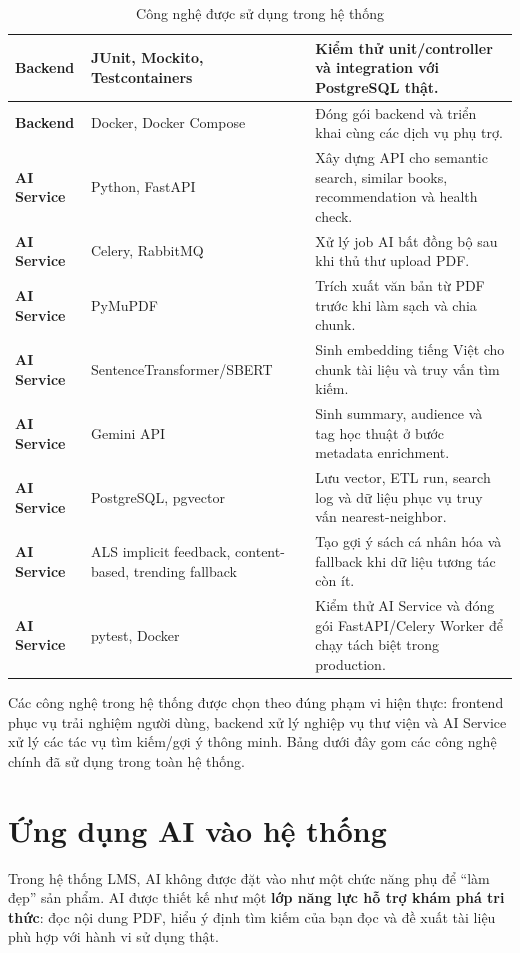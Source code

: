 \begin{table}[H]
\begin{tabularx}{\linewidth}{|p{2.2cm}|p{4.1cm}|X|}
\hline
\textbf{Backend} & JUnit, Mockito, Testcontainers & Kiểm thử unit/controller và integration với PostgreSQL thật. \\
\hline
\textbf{Backend} & Docker, Docker Compose & Đóng gói backend và triển khai cùng các dịch vụ phụ trợ. \\
\hline
\textbf{AI Service} & Python, FastAPI & Xây dựng API cho semantic search, similar books, recommendation và health check. \\
\hline
\textbf{AI Service} & Celery, RabbitMQ & Xử lý job AI bất đồng bộ sau khi thủ thư upload PDF. \\
\hline
\textbf{AI Service} & PyMuPDF & Trích xuất văn bản từ PDF trước khi làm sạch và chia chunk. \\
\hline
\textbf{AI Service} & SentenceTransformer/SBERT & Sinh embedding tiếng Việt cho chunk tài liệu và truy vấn tìm kiếm. \\
\hline
\textbf{AI Service} & Gemini API & Sinh summary, audience và tag học thuật ở bước metadata enrichment. \\
\hline
\textbf{AI Service} & PostgreSQL, pgvector & Lưu vector, ETL run, search log và dữ liệu phục vụ truy vấn nearest-neighbor. \\
\hline
\textbf{AI Service} & ALS implicit feedback, content-based, trending fallback & Tạo gợi ý sách cá nhân hóa và fallback khi dữ liệu tương tác còn ít. \\
\hline
\textbf{AI Service} & pytest, Docker & Kiểm thử AI Service và đóng gói FastAPI/Celery Worker để chạy tách biệt trong production. \\
\hline
\end{tabularx}
\caption{Công nghệ được sử dụng trong hệ thống}
\label{tab:technologies_used}
\end{table}
Các công nghệ trong hệ thống được chọn theo đúng phạm vi hiện thực: frontend
phục vụ trải nghiệm người dùng, backend xử lý nghiệp vụ thư viện và AI Service
xử lý các tác vụ tìm kiếm/gợi ý thông minh. Bảng dưới đây gom các công nghệ
chính đã sử dụng trong toàn hệ thống.

\section{Ứng dụng AI vào hệ thống}
Trong hệ thống LMS, AI không được đặt vào như một chức năng phụ để ``làm đẹp'' sản phẩm. AI được thiết kế như một \textbf{lớp năng lực hỗ trợ khám phá tri thức}: đọc nội dung PDF, hiểu ý định tìm kiếm của bạn đọc và đề xuất tài liệu phù hợp với hành vi sử dụng thật.

